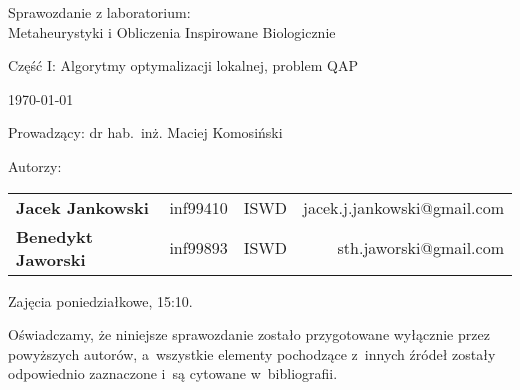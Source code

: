 \thispagestyle{empty} %

\begin{center}
{\large{Sprawozdanie z laboratorium:\\
Metaheurystyki i Obliczenia Inspirowane Biologicznie\\}}

\vspace{3ex}

Część I: Algorytmy optymalizacji lokalnej, problem QAP

\vspace{3ex}
{\footnotesize\today}

\end{center}


\vspace{10ex}

Prowadzący: dr hab.~inż. Maciej Komosiński

\vspace{5ex}

Autorzy:
\begin{tabular}{lllr}
\textbf{Jacek Jankowski} & inf99410 & ISWD & jacek.j.jankowski@gmail.com \\
\textbf{Benedykt Jaworski} & inf99893 & ISWD & sth.jaworski@gmail.com \\
\end{tabular}

\vspace{5ex}

Zajęcia poniedziałkowe, 15:10.

\vspace{35ex}

\noindent Oświadczamy, że niniejsze sprawozdanie zostało przygotowane wyłącznie przez powyższych autorów,
a~wszystkie elementy pochodzące z~innych źródeł zostały odpowiednio zaznaczone i~są cytowane w~bibliografii.  

\newpage

